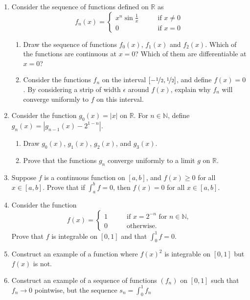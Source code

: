 \documentclass[12pt]{article}
\newcommand{\N}{\mathbb{N}}
\newcommand{\R}{\mathbb{R}}
\begin{document}
\begin{enumerate}
\begin{enumerate}
    \end{enumerate}
  \item Consider the sequence of functions defined on $\R$ as
    \[
    f_n(x) = \left\{
    \begin{array}{ll}
      x^n \sin \frac{1}{x} & \qquad \textrm{if $x\ne 0$} \\
      0 & \qquad \textrm{if $x=0$}
    \end{array}
    \right.
    \]
    \begin{enumerate}
      \item Draw the sequence of functions $f_0(x)$, $f_1(x)$ and $f_2(x)$.
	Which of the functions are continuous at $x=0$? Which of them are
	differentiable at $x=0$?
      \item Consider the functions $f_n$ on the interval
	$[-\nicefrac{1}{2},\nicefrac{1}{2}]$, and define $f(x)=0$. By
	considering a strip of width $\epsilon$ around $f(x)$,
	explain why $f_n$ will converge uniformly to $f$ on this interval.
    \end{enumerate}
  \item Consider the function $g_0(x)=|x|$ on $\R$. For $n\in \N$, define
    $g_n(x)=|g_{n-1}(x)-2^{1-n}|$.
    \begin{enumerate}
      \item Draw $g_0(x)$, $g_1(x)$, $g_2(x)$, and $g_3(x)$.
      \item Prove that the functions $g_n$ converge uniformly to a limit $g$ on
	$\R$.
    \end{enumerate}
  \item Suppose $f$ is a continuous function on $[a,b]$, and $f(x)\ge 0$ for
    all $x\in[a,b]$. Prove that if $\int_a^b f = 0$, then $f(x)=0$ for
    all $x\in[a,b]$.
  \item Consider the function
    \begin{equation}
      f(x)=\begin{cases}
        1 & \qquad \text{if $x=2^{-n}$ for $n\in \N$,} \\
        0 & \qquad \text{otherwise.}
      \end{cases}
    \end{equation}
    Prove that $f$ is integrable on $[0,1]$ and that $\int_0^1 f = 0$.
  \item Construct an example of a function where $f(x)^2$ is integrable on
    $[0,1]$ but $f(x)$ is not.
  \item Construct an example of a sequence of functions $(f_n)$ on $[0,1]$ such
    that $f_n\to 0$ pointwise, but the sequence $s_n = \int_0^1 f_n$

\end{enumerate}
\end{document}
